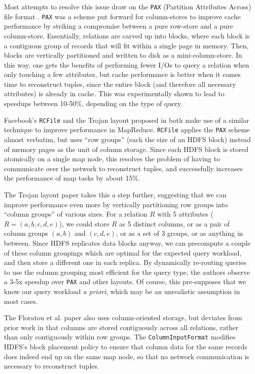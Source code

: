 \documentclass[twocolumn]{article}
\begin{document}
Most attempts to resolve this issue draw on the \verb+PAX+ (Partition Attributes
Across) file format \cite{ref:pax}.  \verb+PAX+ was a scheme put forward for
column-stores to improve cache performance
by striking a compromise between a pure row-store and a pure column-store.  Essentially, 
relations are carved up into blocks, where each block is a contiguous group of
records that will fit within a single page in memory.  Then, blocks are
vertically partitioned and written to disk as a mini-column-store.  In this way, one
gets the benefits of performing fewer I/Os to query a relation when only touching a
few attributes, but cache performance is better when it comes time to reconstruct
tuples, since the entire block (and therefore all necessary attributes) is already
in cache.  This was experimentally shown to lead to speedups between 10-50\%,
depending on the type of query.

Facebook's \verb+RCFile+ \cite{ref:rcfile} and the Trojan layout proposed in
\cite{ref:trojan-layout} both make use of a similar technique to improve performance
in MapReduce.  \verb+RCFile+ applies the \verb+PAX+ scheme almost verbatim,
but uses ``row groups'' (each the size of an HDFS block) instead of memory
pages as the unit of column storage.  Since each HDFS block is stored atomically
on a single map node, this resolves the problem of having to communicate over the
network to reconstruct tuples, and successfully increases the performance of
map tasks by about 15\%.

The Trojan layout paper \cite{ref:trojan-layout} takes this a step further, suggesting
that we can improve performance even more by vertically partitioning row groups into
``column groups'' of various sizes.  For a relation $R$ with 5 attributes
($R = (a, b, c, d, e)$), we could store $R$ as 5 distinct columns, or as a pair
of column groups $(a, b)$ and $(c, d, e)$, or as a set of 3 groups, or as anything
in between.  Since HDFS replicates data blocks anyway, we can precompute a couple
of these column groupings which are optimal for the expected query workload, 
and then store a different one in each replica.  By dynamically
re-routing queries to use the column grouping most efficient for the query type,
the authors observe a 3-5x speedup over \verb+PAX+ and other layouts.
Of course, this pre-supposes that we know our query workload \emph{a priori}, which
may be an unrealistic assumption in most cases.

The Floratou et al. paper \cite{ref:floratou} also uses column-oriented storage,
but deviates from prior work in that columns are stored contiguously across all
relations, rather than only contiguously within row groups.  The \verb+ColumnInputFormat+
modifies HDFS's block placement policy to ensure that column data for the same
records does indeed end up on the same map node, so that no network communication
is necessary to reconstruct tuples.
\end{document}
